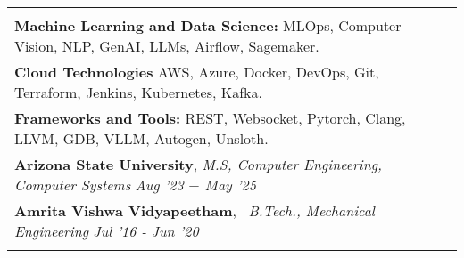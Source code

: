 \documentclass[10pt,a4]{article}
\begin{document}
{\begin{tabu}
\begin{center}
\begin{tabular} {p{} p{} p{} p{}}
\begin{flushleft}
            \hspace{0.5cm}  \textbf{Programming Languages:} Python, C/C++, Spark, SQL, CUDA, Triton, LLVM. \\
            \hspace{0.5cm}  \textbf{Machine Learning and Data Science:} MLOps, Computer Vision, NLP, GenAI, LLMs, Airflow, Sagemaker. \\
            \hspace{0.5cm}  \textbf{Cloud Technologies} AWS, Azure, Docker, DevOps, Git, Terraform, Jenkins, Kubernetes, Kafka. \\
            \hspace{0.5cm}  \textbf{Frameworks and Tools:} REST, Websocket, Pytorch, Clang, LLVM, GDB, VLLM, Autogen, Unsloth. \\

        
    
    	\hspace{1.5mm} \textbf{\large Arizona State University}, \textit{M.S, Computer Engineering, Computer Systems}  \hfill \textit{Aug '23 $-$ May '25}	\\
        
        \hspace{1.5mm} \textbf{\large Amrita Vishwa Vidyapeetham}, \textit{\ B.Tech., Mechanical Engineering} \hfill \textit{ Jul '16 - Jun '20}	\\

\end{flushleft}

\begin{flushleft}
    {\Large \textbf {SKILLS AND CERTIFICATIONS}}
    

\end{flushleft}
\end{tabular}
\end{center}
\end{tabu}}
\end{document}
